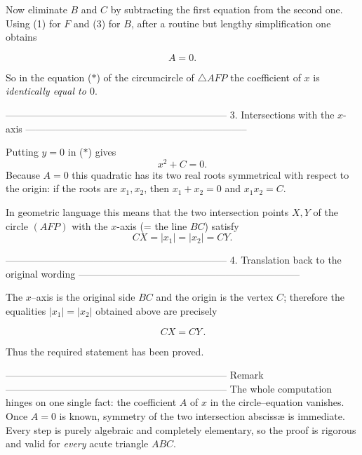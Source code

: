 Now eliminate $B$ and $C$ by subtracting the first equation
from the second one.  Using (1) for $F$ and (3) for $B$,
after a routine but lengthy simplification one obtains

\[
A=0.                                                      \tag{4}
\]

So in the equation ($\ast$) of the circumcircle of $\triangle AFP$ the
coefficient of $x$ is \emph{identically equal to $0$}.

--------------------------------------------------------------------
3.  Intersections with the $x$-axis
--------------------------------------------------------------------

Putting $y=0$ in ($\ast$) gives
\[
x^{2}+C=0 .
\]
Because $A=0$ this quadratic has its two real roots symmetrical with respect
to the origin:
if the roots are $x_{1},x_{2}$, then $x_{1}+x_{2}=0$ and $x_{1}x_{2}=C$.

In geometric language this means that the two intersection points
$X,Y$ of the circle $(AFP)$ with the $x$-axis (= the line $BC$)
satisfy
\[
CX = |x_{1}| = |x_{2}| = CY .
\]

--------------------------------------------------------------------
4.  Translation back to the original wording
--------------------------------------------------------------------

The $x$–axis is the original side $BC$ and the origin is the vertex $C$;
therefore the equalities $|x_{1}|=|x_{2}|$ obtained above are precisely

\[
\boxed{\,CX=CY\,}.
\]

Thus the required statement has been proved.

--------------------------------------------------------------------
Remark
--------------------------------------------------------------------
The whole computation hinges on one single fact: the coefficient $A$
of $x$ in the circle–equation vanishes.  Once $A=0$ is known,
symmetry of the two intersection abscissæ is immediate.
Every step is purely algebraic and completely elementary,
so the proof is rigorous and valid for \emph{every} acute triangle
$ABC$.